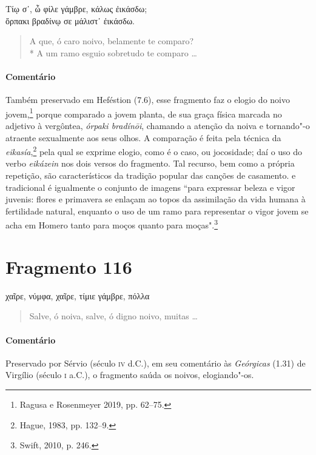 {\begin{gkverse}
Τίῳ σ᾿, ὦ φίλε γάμβρε, κάλως ἐικάσδω;\\
ὄρπακι βραδίνῳ σε μάλιστ᾿ ἐικάσδω.
\end{gkverse}

\begin{verse}
A que, ó caro noivo, belamente te comparo?\\*
A um ramo esguio sobretudo te comparo \ldots{}
\end{verse}

\medskip

{\paragraph{Comentário} Também preservado em Heféstion (7.6), esse fragmento faz o elogio do noivo jovem,\footnote{Ragusa e Rosenmeyer 2019, pp. 62--75.} porque comparado a jovem planta, de sua
graça física marcada no adjetivo à vergôntea, \textit{órpaki bradínōi}, chamando a atenção da noiva e tornando"-o atraente sexualmente aos seus olhos.
A comparação é feita pela técnica da \textit{eikasía},\footnote{Hague, 1983, pp. 132--9.} pela qual se exprime elogio, como é o caso, ou jocosidade; daí o uso do verbo \textit{eikázein} nos dois versos do fragmento. Tal recurso, bem como a própria repetição, são característicos da tradição popular das canções de casamento. e tradicional é igualmente o conjunto de imagens ``para expressar beleza e vigor juvenis: flores e primavera se enlaçam ao topos da assimilação da vida humana à fertilidade natural, enquanto o uso de um ramo para representar o vigor jovem se acha em Homero tanto para moços quanto para moças".\footnote{Swift, 2010, p. 246.}}

\pagebreak
\section{Fragmento 116}

\begin{gkverse}
χαῖρε, νύμφα, χαῖρε, τίμιε γάμβρε, πόλλα
\end{gkverse}

\begin{verse}
Salve, ó noiva, salve, ó digno noivo, muitas \ldots{}
\end{verse}

\medskip

{\paragraph{Comentário} Preservado por Sérvio (século \textsc{iv} d.C.), em seu comentário às \textit{Geórgicas} (1.31) de Virgílio (século \textsc{i} a.C.), o fragmento saúda os noivos, elogiando"-os.}


}
